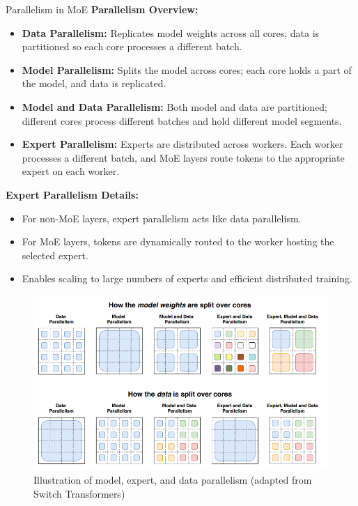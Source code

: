 \begin{frame}[allowframebreaks]{Parallelism in MoE}
    \textbf{Parallelism Overview:}
    \begin{itemize}
        \item \textbf{Data Parallelism:} Replicates model weights across all cores; data is partitioned so each core processes a different batch.
        \item \textbf{Model Parallelism:} Splits the model across cores; each core holds a part of the model, and data is replicated.
        \item \textbf{Model and Data Parallelism:} Both model and data are partitioned; different cores process different batches and hold different model segments.
        \item \textbf{Expert Parallelism:} Experts are distributed across workers. Each worker processes a different batch, and MoE layers route tokens to the appropriate expert on each worker.
    \end{itemize}

    \textbf{Expert Parallelism Details:}
    \begin{itemize}
        \item For non-MoE layers, expert parallelism acts like data parallelism.
        \item For MoE layers, tokens are dynamically routed to the worker hosting the selected expert.
        \item Enables scaling to large numbers of experts and efficient distributed training.
    \end{itemize}

    \begin{figure}
        \centering
        \includegraphics[height=0.6\textheight,width=1\textwidth,keepaspectratio]{images/recent-advance/moe-parallelism.png}
        \caption*{Illustration of model, expert, and data parallelism (adapted from Switch Transformers)}
    \end{figure}
\end{frame}


